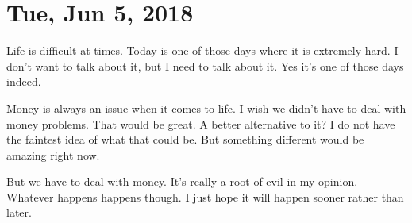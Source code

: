 \section{Tue, Jun 5, 2018}

Life is difficult at times. Today is one of those days where it is extremely
hard. I don't want to talk about it, but I need to talk about it. Yes it's one
of those days indeed.

Money is always an issue when it comes to life. I wish we didn't have to deal
with money problems. That would be great. A better alternative to it? I do not
have the faintest idea of what that could be. But something different would be
amazing right now.

But we have to deal with money. It's really a root of evil in my opinion.
Whatever happens happens though. I just hope it will happen sooner rather than
later.
